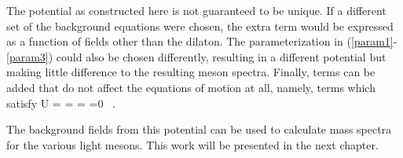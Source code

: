 The potential as constructed here is not guaranteed to be unique.
If a different set of the background equations were chosen, the extra term would be expressed as a function of fields other than the dilaton.
The parameterization in (\ref{param1}-\ref{param3}) could also be chosen differently, resulting in a different potential but making little difference to the resulting meson spectra.
Finally, terms can be added that do not affect the equations of motion at all, namely, terms which satisfy 
\be
\Delta U = \Delta {} = \Delta {} = \Delta {} =0 \, .
\ee

The background fields from this potential can be used to calculate mass spectra for the various light mesons.
This work will be presented in the next chapter.


